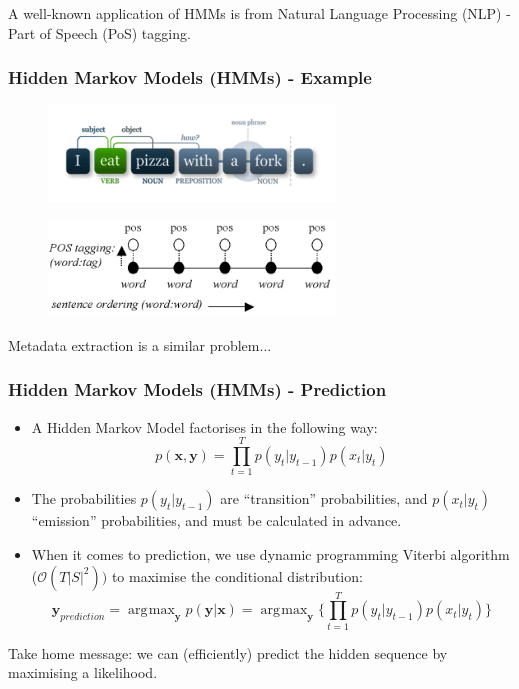\documentclass{beamer}
\DeclareMathOperator*{\argmax}{\arg\!\max}
\begin{document}
\begin{frame}
A well-known application of HMMs is from Natural Language Processing (NLP) - Part of Speech (PoS) tagging.
\frametitle{Hidden Markov Models (HMMs) - Example}
\begin{figure}[!ht]
\center
\includegraphics[width=3in]{figures/pos1.pdf}
\end{figure}

\begin{figure}[!ht]
\center
\includegraphics[width=3in]{figures/pos2.png}
\end{figure}
Metadata extraction is a similar problem...
\end{frame}


\begin{frame}
\frametitle{Hidden Markov Models (HMMs) - Prediction}
\begin{itemize}
\item A Hidden Markov Model factorises in the following way:
$$p(\mathbf{x}, \mathbf{y}) = \prod_{t=1}^T p(y_t | y_{t-1})p(x_t | y_t)$$
\item The probabilities $p(y_t | y_{t-1})$ are ``transition'' probabilities, and $p(x_t | y_t) $``emission'' probabilities, and must be calculated in advance.
\item When it comes to prediction, we use dynamic programming Viterbi algorithm ($\mathcal{O}(T|S|^2))$ to maximise the conditional distribution:
$$\textbf{y}_{prediction} = \argmax_{\textbf{y}} p(\textbf{y} | \textbf{x}) = \argmax_{\textbf{y}}\Bigg\{\prod_{t=1}^T p(y_t | y_{t-1})p(x_t | y_t)\Bigg\}$$
\end{itemize}
Take home message: we can (efficiently) predict the hidden sequence by maximising a likelihood.
\end{frame}

\end{document}
